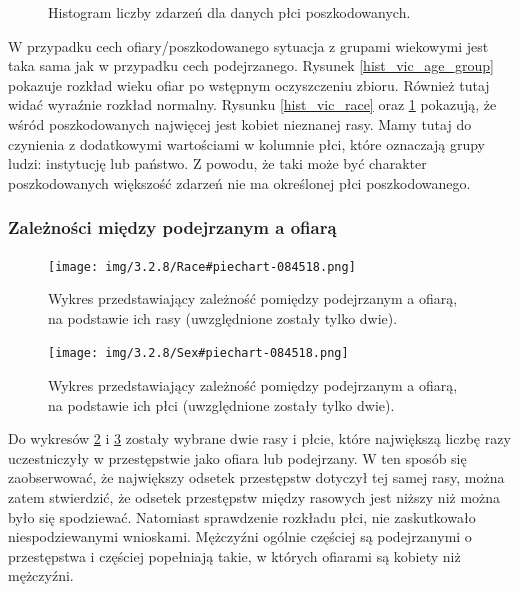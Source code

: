 \documentclass{classrep}
\begin{document}
{{{\begin{figure}[!htbp]
                    \caption{Histogram liczby zdarzeń dla danych płci poszkodowanych.}
                    \label{hist_vic_sex}
                \end{figure}
                \FloatBarrier
                W przypadku cech ofiary/poszkodowanego sytuacja z grupami wiekowymi
                jest taka sama jak w przypadku cech podejrzanego. Rysunek
                \ref{hist_vic_age_group} pokazuje rozkład wieku ofiar po wstępnym
                oczyszczeniu zbioru. Również tutaj widać wyraźnie rozkład normalny.
                Rysunku \ref{hist_vic_race} oraz \ref{hist_vic_sex} pokazują, że wśród
                poszkodowanych najwięcej jest kobiet nieznanej rasy. Mamy tutaj do
                czynienia z dodatkowymi wartościami w kolumnie płci, które oznaczają
                grupy ludzi: instytucję lub państwo. Z powodu, że taki może być
                charakter poszkodowanych większość zdarzeń nie ma określonej płci
                poszkodowanego.
            }

            \subsubsection{Zależności między podejrzanym a ofiarą} {
                \begin{figure}[!htbp]
                    \centering
                    \texttt{[image: img/3.2.8/Race\#piechart-084518.png]}
                    \caption{Wykres przedstawiający zależność pomiędzy podejrzanym a ofiarą,
                    na podstawie ich rasy (uwzględnione zostały tylko dwie).}
                    \label{pie_chart_race}
                \end{figure}
                \begin{figure}[!htbp]
                    \centering
                    \texttt{[image: img/3.2.8/Sex\#piechart-084518.png]}
                    \caption{Wykres przedstawiający zależność pomiędzy podejrzanym a ofiarą,
                    na podstawie ich płci (uwzględnione zostały tylko dwie).}
                    \label{pie_chart_sex}
                \end{figure}
                \FloatBarrier

                Do wykresów \ref{pie_chart_race} i \ref{pie_chart_sex} zostały wybrane
                dwie rasy i płcie, które największą liczbę razy uczestniczyły w
                przestępstwie jako ofiara lub podejrzany. W ten sposób się
                zaobserwować, że największy odsetek przestępstw dotyczył tej samej
                rasy, można zatem stwierdzić, że odsetek przestępstw między rasowych
                jest niższy niż można było się spodziewać. Natomiast sprawdzenie
                rozkładu płci, nie zaskutkowało niespodziewanymi wnioskami. Mężczyźni
                ogólnie częściej są podejrzanymi o przestępstwa i częściej popełniają
                takie, w których ofiarami są kobiety niż mężczyźni.
            }
        }

    }
    
\end{document}
